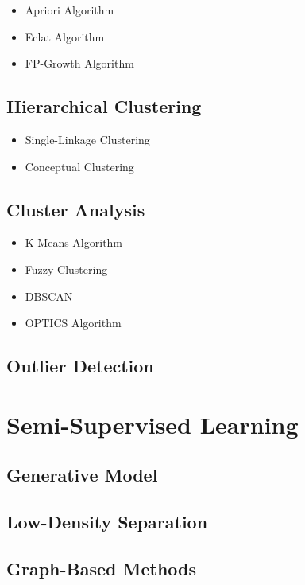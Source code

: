 \documentclass{report}
\begin{document}
		\begin{itemize}
			\item Apriori Algorithm
			\item Eclat Algorithm
			\item FP-Growth Algorithm
		\end{itemize}

	\subsection{Hierarchical Clustering}

		\begin{itemize}
			\item Single-Linkage Clustering
			\item Conceptual Clustering
		\end{itemize}

	\subsection{Cluster Analysis}

		\begin{itemize}
			\item K-Means Algorithm
			\item Fuzzy Clustering
			\item DBSCAN
			\item OPTICS Algorithm
		\end{itemize}

	\subsection{Outlier Detection}

\section{Semi-Supervised Learning}

	\subsection{Generative Model}

	\subsection{Low-Density Separation}

	\subsection{Graph-Based Methods}
\end{document}
